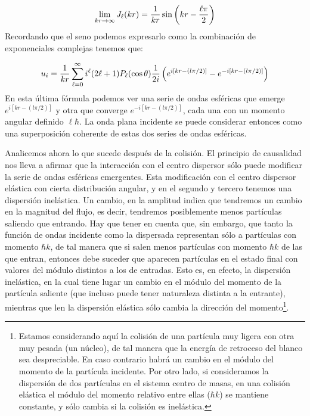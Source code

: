 \begin{equation}
	\lim_{kr\rightarrow \infty} J_{\ell} (kr) = \frac{1}{kr} \sin \left( kr - \frac{\ell \pi}{2} \right)
\end{equation}
Recordando que el seno podemos expresarlo como la combinación de exponenciales complejas tenemos que:

\begin{equation}
	u_i = \frac{1}{kr} \sum_{\ell=0}^{\infty} i^\ell (2\ell +1) P_\ell (\cos \theta) \frac{1}{2i} \left( e^{i[kr-(l\pi/2)]}-e^{-i[kr-(l\pi/2)]} \right)
\end{equation}
En esta última fórmula podemos ver una serie de ondas esféricas que emerge $e^{i[kr-(l\pi/2)]}$ y otra que converge $e^{-i[kr-(l\pi/2)]}$, cada una con un momento angular definido $\ell \hbar$. La onda plana incidente se puede considerar entonces como una superposición coherente de estas dos series de ondas esféricas. 

Analicemos ahora lo que sucede después de la colisión. El principio de causalidad nos lleva a afirmar que la interacción con el centro dispersor sólo puede modificar la serie de ondas esféricas emergentes. Esta modificación con el centro dispersor elástica con cierta distribución angular, y en el segundo y tercero tenemos una dispersión inelástica. Un cambio, en la amplitud indica que tendremos un cambio en la magnitud del flujo, es decir, tendremos posiblemente menos partículas saliendo que entrando. Hay que tener en cuenta que, sin embargo, que tanto la función de ondas incidente como la dispersada representan sólo a partículas con momento $\hbar k$, de tal manera que si salen menos partículas con momento $\hbar k$ de las que entran, entonces debe suceder que aparecen partículas en el estado final con valores del módulo distintos a los de entradas. Esto es, en efecto, la dispersión inelástica, en la cual tiene lugar un cambio en el módulo del momento de la partícula saliente (que incluso puede tener naturaleza distinta a la entrante), mientras que len la dispersión elástica sólo cambia la dirección del momento\footnote{Estamos considerando aquí la colisión de una partícula muy ligera con otra muy pesada (un núcleo), de tal manera que la energía de retroceso del blanco sea despreciable. En caso contrario habrá un cambio en el módulo del momento de la partícula incidente. Por otro lado, si consideramos la dispersión de dos partículas en el sistema centro de masas, en una colisión elástica el módulo del momento relativo entre ellas ($\hbar k$) se mantiene constante, y sólo cambia si la colisión es inelástica.}.


